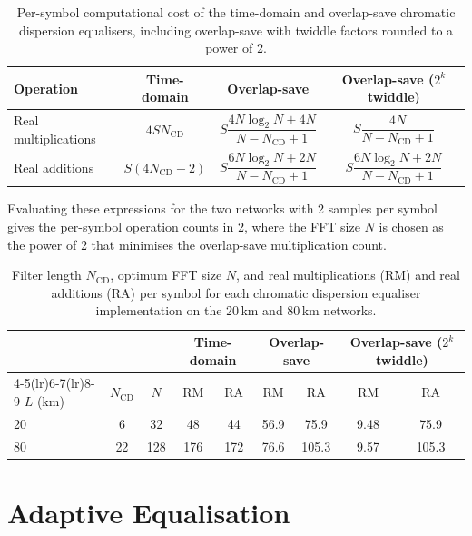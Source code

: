 \documentclass[12pt,a4paper]{article}
\begin{document}
\begin{table}[H]
    \centering
    \begin{tabular}{lccc}
        \toprule
        Operation & Time-domain & Overlap-save & Overlap-save (\(2^k\) twiddle) \\
        \midrule
        Real multiplications & \(4 S N_\mathrm{CD}\)        & \(S\dfrac{4N\log_2 N + 4N}{N - N_\mathrm{CD} + 1}\) & \(S\dfrac{4N}{N - N_\mathrm{CD} + 1}\) \\[8pt]
        Real additions       & \(S\left(4N_\mathrm{CD}-2\right)\) & \(S\dfrac{6N\log_2 N + 2N}{N - N_\mathrm{CD} + 1}\) & \(S\dfrac{6N\log_2 N + 2N}{N - N_\mathrm{CD} + 1}\) \\
        \bottomrule
    \end{tabular}
    \caption{Per-symbol computational cost of the time-domain and overlap-save chromatic dispersion equalisers, including overlap-save with twiddle factors rounded to a power of 2.}
    \label{tab:cd_cost}
\end{table}
Evaluating these expressions for the two networks with 2 samples per symbol gives the per-symbol operation counts in \cref{tab:cd_cost_eval}, where the FFT size \(N\) is chosen as the power of 2 that minimises the overlap-save multiplication count.
\begin{table}[H]
    \centering
    \begin{tabular}{lcccccccc}
        \toprule
        & & & \multicolumn{2}{c}{Time-domain} & \multicolumn{2}{c}{Overlap-save} & \multicolumn{2}{c}{Overlap-save (\(2^k\) twiddle)} \\
        \cmidrule(lr){4-5}\cmidrule(lr){6-7}\cmidrule(lr){8-9}
        \(L\) (km) & \(N_\mathrm{CD}\) & \(N\) & RM & RA & RM & RA & RM & RA \\
        \midrule
        20 & 6  & 32  & 48  & 44  & 56.9 & 75.9  & 9.48 & 75.9  \\
        80 & 22 & 128 & 176 & 172 & 76.6 & 105.3 & 9.57 & 105.3 \\
        \bottomrule
    \end{tabular}
    \caption{Filter length \(N_\mathrm{CD}\), optimum FFT size \(N\), and real multiplications (RM) and real additions (RA) per symbol for each chromatic dispersion equaliser implementation on the 20\,km and 80\,km networks.}
    \label{tab:cd_cost_eval}
\end{table}

\section{Adaptive Equalisation}
\end{document}
